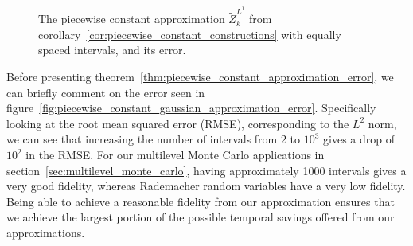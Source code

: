 \documentclass[manuscript,review]{acmart}
\begin{document}
\begin{figure}[htb]
\centering

\hfil
{}\hfil
{}\hfil

\caption{The piecewise constant approximation $ \tilde{Z}_k^{L^1} $ from corollary~\ref{cor:piecewise_constant_constructions} with equally spaced intervals, and its error.}
\label{fig:piecewise_constant_approximation}
\end{figure}

Before presenting theorem~\ref{thm:piecewise_constant_approximation_error}, we can briefly comment on the error seen in figure~\ref{fig:piecewise_constant_gaussian_approximation_error}. Specifically looking at the root mean squared error (RMSE), corresponding to the $ L^2 $ norm, we can see that increasing the number of intervals from 2 to $ 10^3 $ gives a drop of $ 10^2 $ in the RMSE. For our multilevel Monte Carlo applications in section~\ref{sec:multilevel_monte_carlo}, having approximately 1000 intervals gives a very good fidelity, whereas Rademacher random variables have a very low fidelity. Being able to achieve a reasonable fidelity from our approximation ensures that we achieve the largest portion of the possible temporal savings offered from our approximations. 
\end{document}
